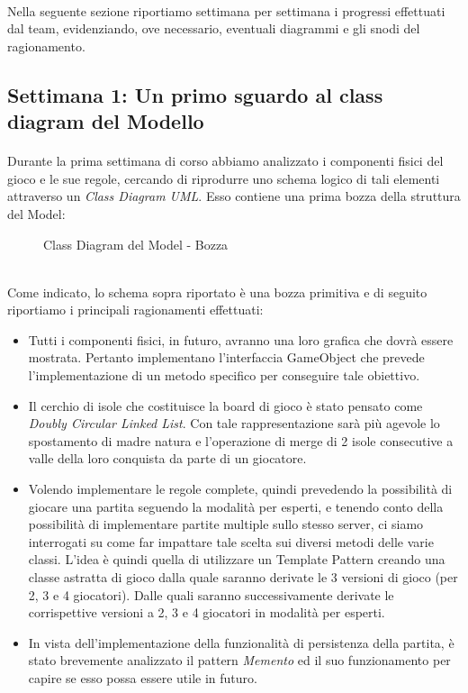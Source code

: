 \documentclass[a4paper, 12pt]{article}
\begin{document}
	\paragraph{}
	Nella seguente sezione riportiamo settimana per settimana i progressi effettuati dal team, evidenziando, ove necessario, eventuali diagrammi e gli snodi del ragionamento.
	\subsection{Settimana 1: Un primo sguardo al class diagram del Modello}
	\paragraph{}
	Durante la prima settimana di corso abbiamo analizzato i componenti fisici del gioco e le sue regole, cercando di riprodurre uno schema logico di tali elementi attraverso un \emph{Class Diagram UML}. Esso contiene una prima bozza della struttura del Model:\\
	\begin{figure}[h]
		\centering
		\def\svgwidth{\columnwidth}
		\resizebox{\linewidth}{!}{}
		\caption{Class Diagram del Model - Bozza}
	\end{figure}\\
	Come indicato, lo schema sopra riportato è una bozza primitiva e di seguito riportiamo i principali ragionamenti effettuati:\\
	\begin{itemize}
		\setlength{\parskip}{0pt}
		\setlength{\parsep}{0pt}
		
		\item Tutti i componenti fisici, in futuro, avranno una loro grafica che dovrà essere mostrata. Pertanto implementano l'interfaccia GameObject che prevede l'implementazione di un metodo specifico per conseguire tale obiettivo.
		\item Il cerchio di isole che costituisce la board di gioco è stato pensato come \emph{Doubly Circular Linked List}\cite{circularDoublyLinkedList}. Con tale rappresentazione sarà più agevole lo spostamento di madre natura e l'operazione di merge di 2 isole consecutive a valle della loro conquista da parte di un giocatore.
		\item Volendo implementare le regole complete, quindi prevedendo la possibilità di giocare una partita seguendo la modalità per esperti, e tenendo conto della possibilità di implementare partite multiple sullo stesso server, ci siamo interrogati su come far impattare tale scelta sui diversi metodi delle varie classi. L'idea è quindi quella di utilizzare un Template Pattern creando una classe astratta di gioco dalla quale saranno derivate le 3 versioni di gioco (per 2, 3 e 4 giocatori). Dalle quali saranno successivamente derivate le corrispettive versioni a 2, 3 e 4 giocatori in modalità per esperti.
		\item In vista dell'implementazione della funzionalità di persistenza della partita, è stato brevemente analizzato il pattern \emph{Memento} ed il suo funzionamento per capire se esso possa essere utile in futuro.
	\end{itemize}
	
\end{document}

